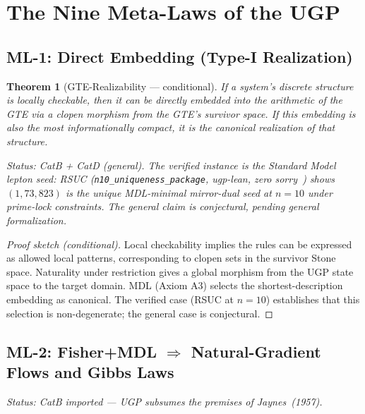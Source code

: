 \documentclass[11pt]{article}
\newtheorem{theorem}{Theorem}[section]
\begin{document}
\section{The Nine Meta-Laws of the UGP}

\subsection{ML-1: Direct Embedding (Type-I Realization)}
\begin{theorem}[GTE-Realizability — conditional]
If a system's discrete structure is locally checkable, then it can be directly embedded into the arithmetic of the GTE via a clopen morphism from the GTE's survivor space. If this embedding is also the most informationally compact, it is the canonical realization of that structure.

\begin{sloppypar}\emph{Status: CatB + CatD (general).} The verified instance is the Standard Model lepton seed: RSUC (\texttt{n10\_uniqueness\_package}, ugp-lean, zero sorry~\cite{SpivackUGPFormalization}) shows $(1,73,823)$ is the unique MDL-minimal mirror-dual seed at $n=10$ under prime-lock constraints. The general claim is conjectural, pending general formalization.\end{sloppypar}
\end{theorem}
\begin{proof}[Proof sketch (conditional)]
Local checkability implies the rules can be expressed as allowed local patterns, corresponding to clopen sets in the survivor Stone space. Naturality under restriction gives a global morphism from the UGP state space to the target domain. MDL (Axiom A3) selects the shortest-description embedding as canonical. The verified case (RSUC at $n=10$) establishes that this selection is non-degenerate; the general case is conjectural.
\end{proof}

\subsection{ML-2: Fisher+MDL $\Rightarrow$ Natural-Gradient Flows and Gibbs Laws}
\emph{Status: CatB imported — UGP subsumes the premises of Jaynes~(1957).}
\end{document}
